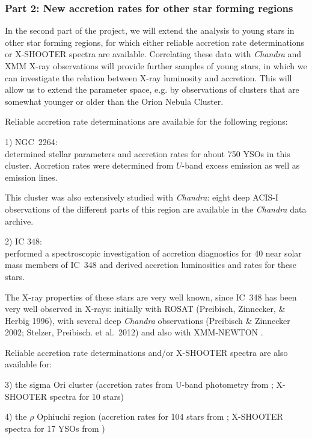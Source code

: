 \documentclass[10pt,fleqn,twoside,a4paper]{article}
\begin{document}
\subsubsection*{Part 2: New accretion rates for other star forming regions}

In the second part of the project, we will extend the analysis to young stars in other
star forming regions, for which either reliable accretion rate determinations
or X-SHOOTER spectra are available.
Correlating these data with \textit{Chandra} and XMM X-ray 
observations will provide
further samples of young stars, in which we can investigate the
relation between X-ray luminosity and accretion.
%
This will allow us to extend the parameter space, e.g. by observations
of clusters that are somewhat younger or older than the Orion Nebula Cluster.

Reliable accretion rate determinations are available for the
following regions:
\medskip


{1) NGC~2264:}\\
\citet{Venuti14} determined stellar parameters and accretion rates for about 
750 YSOs in this cluster. Accretion rates were determined from $U$-band excess emission
as well as emission lines. 

This cluster was also extensively studied with \textit{Chandra}: eight deep ACIS-I
observations of the different parts of this region are available in the 
\textit{Chandra} data archive.
\medskip

2) IC 348:\\
\citet{Dahm08} performed a spectroscopic investigation of accretion
diagnostics for 40 near solar mass members of IC~348
and derived accretion luminosities and rates for these stars.

The X-ray properties of these stars are very well known, since IC~348
has been very well observed in X-rays: initially with
ROSAT (Preibisch, Zinnecker, \& Herbig 1996), with
several deep \textit{Chandra} observations (Preibisch \& Zinnecker 2002;
Stelzer, Preibisch. et al.~2012) and also with XMM-NEWTON \citep{PZ04}.
\medskip

Reliable accretion rate determinations and/or X-SHOOTER spectra are also
available for:\smallskip


3) the sigma Ori cluster (accretion rates from U-band photometry from \citet{Rigliaco11};
X-SHOOTER spectra  for 10 stars)
\smallskip

4) the $\rho$ Ophiuchi region (accretion rates for 104 stars from \citet{Natta06};
X-SHOOTER spectra for 17 YSOs from \citet{Manara15})
\smallskip
\end{document}
